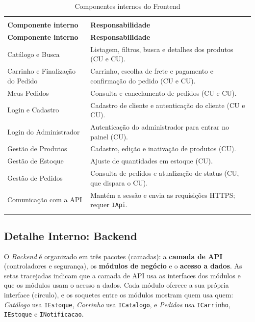 \documentclass[12pt,a4paper]{article}
\begin{document}
{\setlength{\arrayrulewidth}{0.3pt}\renewcommand{\arraystretch}{1.15}
\begin{xltabular}{\textwidth}{>{\raggedright\arraybackslash}p{4.6cm}|>{\raggedright\arraybackslash}X}
\caption{Componentes internos do Frontend}\\
\toprule{}
\textbf{Componente interno} & \textbf{Responsabilidade}\\ \midrule{}
\endfirsthead
{}\toprule{}
\textbf{Componente interno} & \textbf{Responsabilidade}\\ \midrule{}
\endhead
\endlastfoot
Catálogo e Busca & Listagem, filtros, busca e detalhes dos produtos (CU e CU).\\ \hline
Carrinho e Finalização do Pedido & Carrinho, escolha de frete e pagamento e confirmação do pedido (CU e CU).\\ \hline
Meus Pedidos & Consulta e cancelamento de pedidos (CU e CU).\\ \hline
Login e Cadastro & Cadastro de cliente e autenticação do cliente (CU e CU).\\ \hline
Login do Administrador & Autenticação do administrador para entrar no painel (CU).\\ \hline
Gestão de Produtos & Cadastro, edição e inativação de produtos (CU).\\ \hline
Gestão de Estoque & Ajuste de quantidades em estoque (CU).\\ \hline
Gestão de Pedidos & Consulta de pedidos e atualização de status (CU, que dispara o CU).\\ \hline
Comunicação com a API & Mantém a sessão e envia as requisições HTTPS; requer \texttt{IApi}.\\ \bottomrule
\end{xltabular}}

\subsection{Detalhe Interno: Backend}\label{sec:backend-detalhe}

O \emph{Backend} é organizado em três pacotes (camadas): a \textbf{camada
de API} (controladores e segurança), os \textbf{módulos de negócio} e o
\textbf{acesso a dados}. As setas tracejadas indicam que a camada de API usa
as interfaces dos módulos e que os módulos usam o acesso a dados. Cada
módulo oferece a sua própria interface (círculo), e os soquetes entre os
módulos mostram quem usa quem: \emph{Catálogo} usa \texttt{IEstoque},
\emph{Carrinho} usa \texttt{ICatalogo}, e \emph{Pedidos} usa
\texttt{ICarrinho}, \texttt{IEstoque} e \texttt{INotificacao}.
\end{document}
